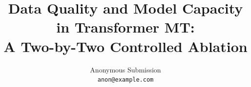 \documentclass[11pt]{article}
\title{Data Quality and Model Capacity in Transformer MT:\\
  A Two-by-Two Controlled Ablation}
\author{
  Anonymous Submission \\
  \texttt{anon@example.com}
}
\begin{document}
\maketitle

\begin{abstract}

\end{abstract}












\end{document}
